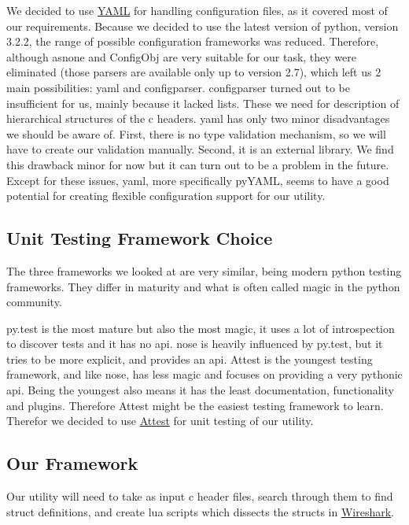 We decided to use \hyperref[sec:pre:yaml]{YAML} for handling configuration
files, as it covered most of our requirements. Because we decided to use the
latest version of \Gls{python}, version 3.2.2, the range of possible configuration
frameworks was reduced. Therefore, although \gls{asnone} and ConfigObj are very
suitable for our task, they were eliminated (those \glspl{parser} are available
only up to version 2.7), which left us 2 main possibilities: \Gls{yaml} and
configparser. configparser turned out to be insufficient for us, mainly because
it lacked lists. These we need for description of hierarchical structures of
the \Gls{c} \glspl{header}. \Gls{yaml} has only two minor disadvantages we should be aware of.
First, there is no type validation mechanism, so we will have to create our
validation manually. Second, it is an external \gls{library}. We find this drawback
minor for now but it can turn out to be a problem in the future. Except for
these issues, \Gls{yaml}, more specifically pyYAML, seems to have a good potential
for creating flexible configuration support for our \gls{utility}.

\subsection{Unit Testing Framework Choice}
\label{sec:pre:testchoice}
The three frameworks we looked at  are very similar, being modern \Gls{python}
testing frameworks. They differ in maturity and what is often called magic in
the \Gls{python} community.

py.test is the most mature but also the most magic, it uses a lot of
introspection to discover tests and it has no \Gls{api}. nose is heavily influenced
by py.test, but it tries to be more explicit, and provides an \Gls{api}. Attest is
the youngest testing framework, and like nose, has less magic and focuses on
providing a very pythonic \Gls{api}. Being the youngest also means it has the least
documentation, functionality and plugins. Therefore Attest might be the easiest
testing framework to learn. Therefor we decided to use
\hyperref[sec:pre:attest]{Attest} for unit testing of our \gls{utility}.

\subsection{Our Framework}
\label{sec:pre:framework}
Our \gls{utility} will need to take as input \Gls{c} \gls{header} files, search through them to
find \gls{struct} definitions, and create \Gls{lua} scripts which dissects the \glspl{struct} in
\hyperref[sec:pre:wireshark]{Wireshark}.

